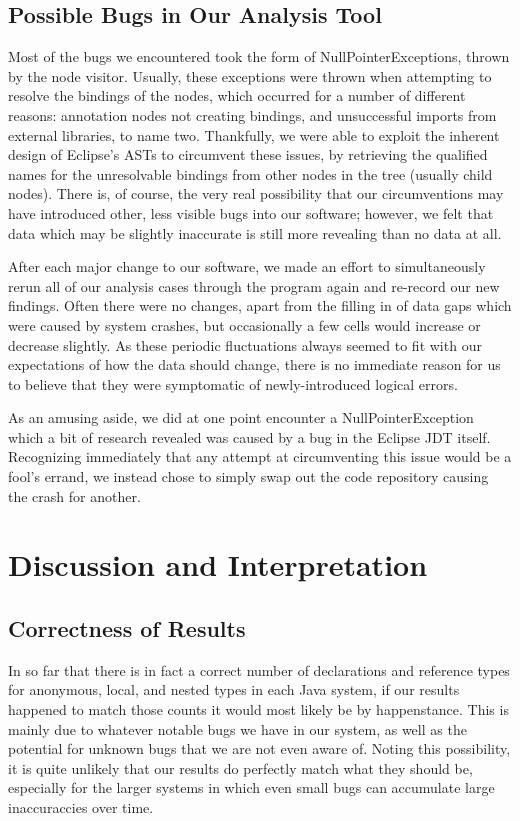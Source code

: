 \documentclass[12p]{article}
\begin{document}
\subsection{Possible Bugs in Our Analysis Tool}


Most of the bugs we encountered took the form of NullPointerExceptions, thrown by the node visitor. Usually, these exceptions were thrown when attempting to resolve the bindings of the nodes, which occurred for a number of different reasons: annotation nodes not creating bindings, and unsuccessful imports from external libraries, to name two. Thankfully, we were able to exploit the inherent design of Eclipse’s ASTs to circumvent these issues, by retrieving the qualified names for the unresolvable bindings from other nodes in the tree (usually child nodes). There is, of course, the very real possibility that our circumventions may have introduced other, less visible bugs into our software; however, we felt that data which may be slightly inaccurate is still more revealing than no data at all.

After each major change to our software, we made an effort to simultaneously rerun all of our analysis cases through the program again and re-record our new findings. Often there were no changes, apart from the filling in of data gaps which were caused by system crashes, but occasionally a few cells would increase or decrease slightly. As these periodic fluctuations always seemed to fit with our expectations of how the data should change, there is no immediate reason for us to believe that they were symptomatic of newly-introduced logical errors.

As an amusing aside, we did at one point encounter a NullPointerException which a bit of research revealed was caused by a bug in the Eclipse JDT itself. Recognizing immediately that any attempt at circumventing this issue would be a fool’s errand, we instead chose to simply swap out the code repository causing the crash for another.


\section{Discussion and Interpretation}

\subsection{Correctness of Results}

In so far that there is in fact a correct number of declarations and reference types for anonymous, local, and nested types in each Java system, if our results happened to match those counts it would most likely be by happenstance. This is mainly due to whatever notable bugs we have in our system, as well as the potential for unknown bugs that we are not even aware of. Noting this possibility, it is quite unlikely that our results do perfectly match what they should be, especially for the larger systems in which even small bugs can accumulate large inaccuraccies over time.
\end{document}
